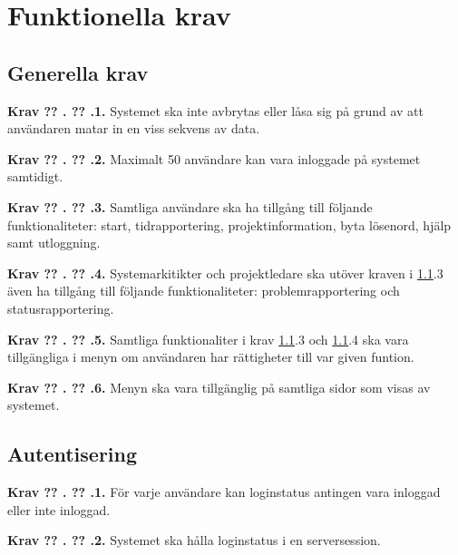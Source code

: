 \documentclass[a4paper]{article}
\newcommand\getcurrentref[1]{%
 \ifnumequal{\value{#1}}{0}
  {??}
  {\the\value{#1}}%
}
\newcommand\requirement[2]{
	\numberedrow{Krav}{#1}{#2}
}
\newcommand\numberedrow[3]{
	\noindent
	\textbf{#1 \getcurrentref{section}.\getcurrentref{subsection}.#2.} #3
	
}
\begin{document}
\section{Funktionella krav}
\subsection{Generella krav}
\label{krav-funk-gen}

 \requirement{1}{Systemet ska inte avbrytas eller låsa sig på grund av att användaren matar in en viss sekvens av data.}
\requirement{2}{Maximalt 50 användare kan vara inloggade på systemet samtidigt.}
\requirement{3}{Samtliga användare ska ha tillgång till följande funktionaliteter: start, tidrapportering, projektinformation, byta lösenord, hjälp samt utloggning.}
\requirement{4}{Systemarkitikter och projektledare ska utöver kraven i \ref{krav-funk-gen}.3 även ha tillgång till följande funktionaliteter: problemrapportering och statusrapportering.}
\requirement{5}{Samtliga funktionaliter i krav \ref{krav-funk-gen}.3 och \ref{krav-funk-gen}.4 ska vara tillgängliga i menyn om användaren har rättigheter till var given funtion.}
\requirement{6}{Menyn ska vara tillgänglig på samtliga sidor som visas av systemet.}
 
\subsection{Autentisering}
\label{krav-funk-aut}
\requirement{1}{För varje användare kan loginstatus antingen vara inloggad eller inte inloggad.}
\requirement{2}{Systemet ska hålla loginstatus i en serversession.}

\end{document}
